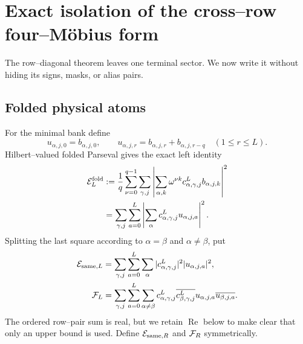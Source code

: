 \section{Exact isolation of the cross--row four--M\"obius form}
\label{sec:tpc41-physical-four}

The row--diagonal theorem leaves one terminal sector.  We now write it
without hiding its signs, masks, or alias pairs.

\subsection{Folded physical atoms}

For the minimal bank define
\begin{equation}
 u_{\alpha,j,0}=b_{\alpha,j,0},
 \qquad
 u_{\alpha,j,r}
 =b_{\alpha,j,r}+b_{\alpha,j,r-q}
 \quad(1\le r\le L).
 \label{eq:tpc41-physical-u}
\end{equation}
Hilbert--valued folded Parseval gives the exact left identity
\begin{align}
 \mathcal E_L^{\rm fold}
 &:=\frac1q\sum_{\nu=0}^{q-1}
   \sum_{\gamma,j}
   \left|
    \sum_{\alpha,k}\omega^{\nu k}
    c^L_{\alpha,\gamma,j}b_{\alpha,j,k}
   \right|^2
 \notag\\
 &=\sum_{\gamma,j}\sum_{a=0}^{L}
   \left|
    \sum_\alpha c^L_{\alpha,\gamma,j}u_{\alpha,j,a}
   \right|^2.
 \label{eq:tpc41-physical-folded-energy}
\end{align}
Splitting the last square according to \(\alpha=\beta\) and
\(\alpha\ne\beta\), put
\begin{align}
 \mathcal E_{{\rm same},L}
 &=\sum_{\gamma,j}\sum_{a=0}^{L}\sum_\alpha
   |c^L_{\alpha,\gamma,j}|^2|u_{\alpha,j,a}|^2,
 \label{eq:tpc41-physical-same-L}\\
 \mathcal F_L
 &=\sum_{\gamma,j}\sum_{a=0}^{L}
   \sum_{\alpha\ne\beta}
   c^L_{\alpha,\gamma,j}
   \overline{c^L_{\beta,\gamma,j}}
   u_{\alpha,j,a}\overline{u_{\beta,j,a}}.
 \label{eq:tpc41-physical-FL}
\end{align}
The ordered row--pair sum is real, but we retain \(\operatorname{Re}\)
below to make clear that only an upper bound is used.  Define
\(\mathcal E_{{\rm same},R}\) and \(\mathcal F_R\) symmetrically.

